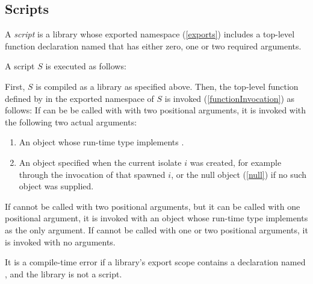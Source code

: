 \documentclass{article}
\begin{document}


\subsection{Scripts}

\LMHash{}
A {\em script} is a library whose exported namespace (\ref{exports}) includes
a top-level function declaration named 
that has either zero, one or two required arguments.

A script $S$ is executed as follows:

\LMHash{}
First, $S$ is compiled as a library as specified above.
Then, the top-level function defined by 
in the exported namespace of $S$ is invoked (\ref{functionInvocation})
as follows:
If  can be be called with with two positional arguments,
it is invoked with the following two actual arguments:
\begin{enumerate}
\item An object whose run-time type implements .
\item An object specified when the current isolate $i$ was created,
for example through the invocation of  that spawned $i$,
or the null object (\ref{null}) if no such object was supplied.
\end{enumerate}
If  cannot be called with two positional arguments,
but it can be called with one positional argument,
it is invoked with an object whose run-time type implements 
as the only argument.
If  cannot be called with one or two positional arguments,
it is invoked with no arguments.



\LMHash{}
It is a compile-time error if a library's export scope contains a declaration
named , and the library is not a script.
\end{document}
